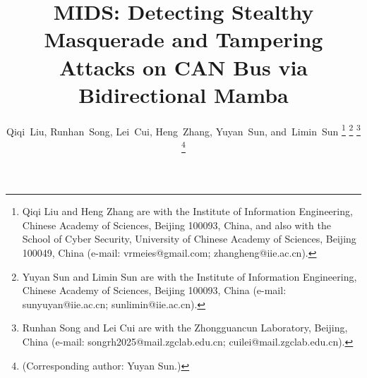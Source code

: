 \documentclass[lettersize,journal]{IEEEtran}
\begin{document}
\title{MIDS: Detecting Stealthy Masquerade and Tampering\\ Attacks on CAN Bus via Bidirectional Mamba}

\author{Qiqi~Liu, 
        Runhan~Song, 
        Lei~Cui,
        Heng~Zhang, 
        Yuyan~Sun, 
        and~Limin~Sun%
\thanks{Qiqi Liu and Heng Zhang are with the Institute of Information Engineering, Chinese Academy of Sciences, Beijing 100093, China, and also with the School of Cyber Security, University of Chinese Academy of Sciences, Beijing 100049, China (e-mail: vrmeies@gmail.com; zhangheng@iie.ac.cn).}%
\thanks{Yuyan Sun and Limin Sun are with the Institute of Information Engineering, Chinese Academy of Sciences, Beijing 100093, China (e-mail: sunyuyan@iie.ac.cn; sunlimin@iie.ac.cn).}%
\thanks{Runhan Song and Lei Cui are with the Zhongguancun Laboratory, Beijing, China (e-mail: songrh2025@mail.zgclab.edu.cn; cuilei@mail.zgclab.edu.cn). }%
\thanks{(Corresponding author: Yuyan Sun.)}%
}



\maketitle
\end{document}
